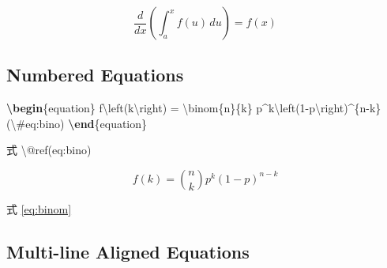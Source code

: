 \documentclass[oneside]{book}
\newenvironment{Shaded}{\begin{snugshade}}{\end{snugshade}}
\newcommand{\ExtensionTok}[1]{#1}
\newcommand{\FunctionTok}[1]{\textcolor[rgb]{0.00,0.00,0.00}{#1}}
\newcommand{\KeywordTok}[1]{\textcolor[rgb]{0.13,0.29,0.53}{\textbf{#1}}}
\newcommand{\NormalTok}[1]{#1}
\newcommand{\SpecialCharTok}[1]{\textcolor[rgb]{0.00,0.00,0.00}{#1}}
\newcommand{\SpecialStringTok}[1]{\textcolor[rgb]{0.31,0.60,0.02}{#1}}
\theoremstyle{definition}
\theoremstyle{definition}
\theoremstyle{definition}
\theoremstyle{remark}
\begin{document}
\begin{equation*} 
\frac{d}{dx}\left( \int_{a}^{x} f(u)\,du\right)=f(x)
\end{equation*}

\hypertarget{numbered-equations}{%
\subsection{Numbered Equations}\label{numbered-equations}}

\begin{Shaded}
\begin{Highlighting}[]
\KeywordTok{\textbackslash{}begin}\NormalTok{\{}\ExtensionTok{equation}\NormalTok{\}}\SpecialStringTok{ }
\SpecialStringTok{  f}\SpecialCharTok{\textbackslash{}left}\SpecialStringTok{(k}\SpecialCharTok{\textbackslash{}right}\SpecialStringTok{) = }\SpecialCharTok{\textbackslash{}binom}\SpecialStringTok{\{n\}\{k\} p^k}\SpecialCharTok{\textbackslash{}left}\SpecialStringTok{(1-p}\SpecialCharTok{\textbackslash{}right}\SpecialStringTok{)^\{n-k\}}
\SpecialStringTok{  (}\SpecialCharTok{\textbackslash{}#}\SpecialStringTok{eq:bino)}
\KeywordTok{\textbackslash{}end}\NormalTok{\{}\ExtensionTok{equation}\NormalTok{\} }

\NormalTok{式 }\FunctionTok{\textbackslash{}@ref}\NormalTok{(eq:bino)}
\end{Highlighting}
\end{Shaded}

\begin{equation} 
  f\left(k\right) = \binom{n}{k} p^k\left(1-p\right)^{n-k}
  \label{eq:binom}
\end{equation}

式 \eqref{eq:binom}

\hypertarget{multi-line-aligned-equations}{%
\subsection{Multi-line Aligned Equations}\label{multi-line-aligned-equations}}
\end{document}
